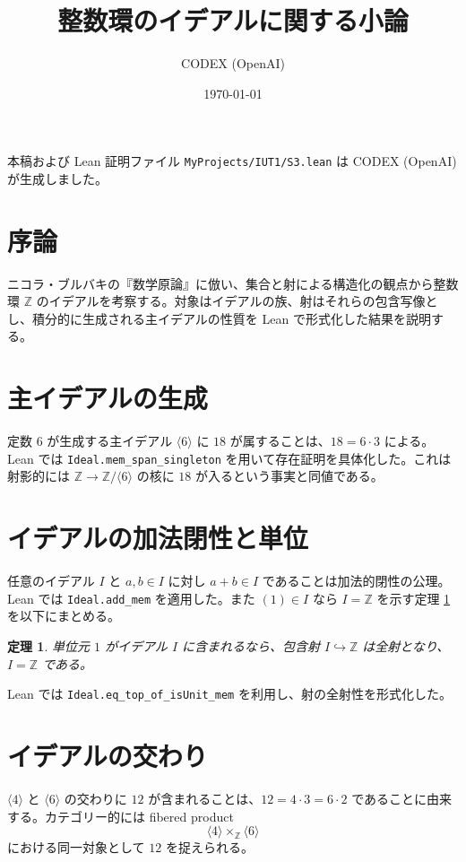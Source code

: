 \documentclass[a4paper]{ltjsarticle}
\title{整数環のイデアルに関する小論}
\author{CODEX (OpenAI)}
\date{\today}
\theoremstyle{definition}
\theoremstyle{plain}
\newtheorem{theorem}{定理}
\theoremstyle{remark}
\begin{document}
\maketitle

\begin{center}
  本稿および Lean 証明ファイル \texttt{MyProjects/IUT1/S3.lean} は CODEX (OpenAI) が生成しました。
\end{center}

\section*{序論}
ニコラ・ブルバキの『数学原論』に倣い、集合と射による構造化の観点から整数環 $\mathbb{Z}$ のイデアルを考察する。対象はイデアルの族、射はそれらの包含写像とし、積分的に生成される主イデアルの性質を Lean で形式化した結果を説明する。

\section{主イデアルの生成}
定数 $6$ が生成する主イデアル $\langle 6 \rangle$ に $18$ が属することは、$18 = 6 \cdot 3$ による。Lean では \texttt{Ideal.mem\_span\_singleton} を用いて存在証明を具体化した。これは射影的には $\mathbb{Z} \to \mathbb{Z}/\langle 6 \rangle$ の核に $18$ が入るという事実と同値である。

\section{イデアルの加法閉性と単位}
任意のイデアル $I$ と $a,b\in I$ に対し $a+b\in I$ であることは加法的閉性の公理。Lean では \texttt{Ideal.add\_mem} を適用した。また $(1)\in I$ なら $I=\mathbb{Z}$ を示す定理 \ref{thm:unit} を以下にまとめる。

\begin{theorem}\label{thm:unit}
単位元 $1$ がイデアル $I$ に含まれるなら、包含射 $I\hookrightarrow \mathbb{Z}$ は全射となり、$I=\mathbb{Z}$ である。
\end{theorem}

Lean では \texttt{Ideal.eq\_top\_of\_isUnit\_mem} を利用し、射の全射性を形式化した。

\section{イデアルの交わり}
$\langle 4 \rangle$ と $\langle 6 \rangle$ の交わりに $12$ が含まれることは、$12=4\cdot 3=6\cdot 2$ であることに由来する。カテゴリー的には fibered product
\[
  \langle 4 \rangle \times_{\mathbb{Z}} \langle 6 \rangle
\]
における同一対象として $12$ を捉えられる。
\end{document}

